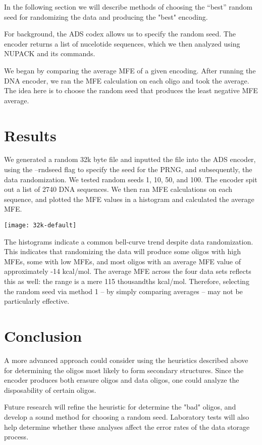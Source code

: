 \documentclass{article}
\begin{document}
In the following section we will describe methods of choosing the “best” random seed for randomizing the data and producing the "best" encoding. 

For background, the ADS codex allows us to specify the random seed. The encoder returns a list of nucelotide sequences, which we then analyzed using NUPACK and its commands.

We began by comparing the average MFE of a given encoding. After running the DNA encoder, we ran the MFE calculation on each oligo and took the average. The idea here is to choose the random seed that produces the least negative MFE average.

\section{Results}
We generated a random 32k byte file and inputted the file into the ADS encoder, using the --rndseed flag to specify the seed for the PRNG, and subsequently, the data randomization. We tested random seeds 1, 10, 50, and 100. The encoder spit out a list of 2740 DNA sequences. We then ran MFE calculations on each sequence, and plotted the MFE values in a histogram and calculated the average MFE.

\texttt{[image: 32k-default]}

The histograms indicate a common bell-curve trend despite data randomization. This indicates that randomizing the data will produce some oligos with high MFEs, some with low MFEs, and most oligos with an average MFE value of approximately -14 kcal/mol. The average MFE across the four data sets reflects this as well: the range is a mere 115 thousandths kcal/mol. Therefore, selecting the random seed via method 1 -- by simply comparing averages -- may not be particularly effective.


\section{Conclusion}
A more advanced approach could consider using the heuristics described above for determining the oligos most likely to form secondary structures. Since the encoder produces both erasure oligos and data oligos, one could analyze the disposability of certain oligos. 

Future research will refine the heuristic for determine the "bad" oligos, and develop a sound method for choosing a random seed. Laboratory tests will also help determine whether these analyses affect the error rates of the data storage process.
\end{document}
